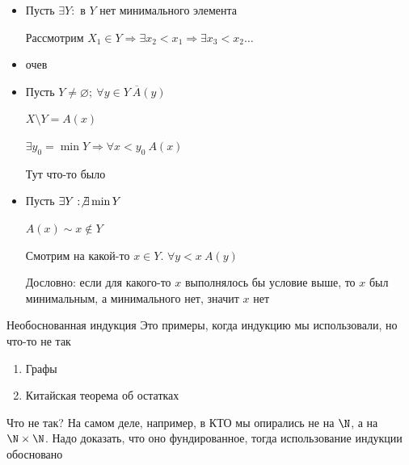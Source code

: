 \documentclass[12pt]{article}
\begin{document}
\begin{Proof}{}


\begin{itemize}
    \item[$2 \Rightarrow 1$] Пусть $\exists Y :$ в $Y$ нет минимального элемента
    
    Рассмотрим $X_1 \in Y \Rightarrow \exists x_2 < x_1 \Rightarrow \exists x_3 < x_2 \ldots$

    \item[$1 \Rightarrow 2$] очев 
    
    \item[$1 \Rightarrow 3$] Пусть $Y \neq \varnothing;\ \forall y \in Y\ \overline{A}(y)$
    
    $X \setminus Y = A(x)$

    $\exists y_0 = \min Y \Rightarrow \forall x < y_0\ A(x)$

    Тут что-то было

    \item[$3 \Rightarrow 1$] Пусть $\exists Y : \not\exists \min Y$
    
    $A(x) \sim x \notin Y$

    Смотрим на какой-то $x \in Y$. $\forall y < x\ A(y)$

    Дословно: если для какого-то $x$ выполнялось бы условие выше, то $x$ был минимальным, а минимального нет, значит $x$ нет
\end{itemize}

\end{Proof}


\begin{rem}{Необоснованная индукция}
    Это примеры, когда индукцию мы использовали, но что-то не так

    \begin{enumerate}
        \item Графы
        \item Китайская теорема об остатках
    \end{enumerate}

    Что не так? На самом деле, например, в КТО мы опирались не на $\N$, а на $\N \times \N$. Надо доказать, что оно фундированное, тогда использование индукции обосновано
\end{rem}
\end{document}
